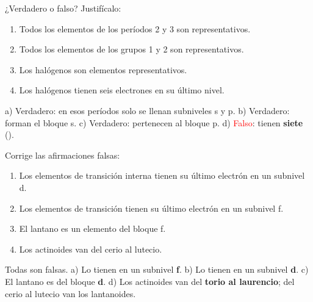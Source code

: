 \begin{exercise}
    ¿Verdadero o falso? Justifícalo:
    \begin{enumerate}[label=\alph*)]
        \item Todos los elementos de los períodos 2 y 3 son representativos.
        \item Todos los elementos de los grupos 1 y 2 son representativos.
        \item Los halógenos son elementos representativos.
        \item Los halógenos tienen seis electrones en su último nivel.
    \end{enumerate}
    \begin{solu}
        a) Verdadero: en esos períodos solo se llenan subniveles s y p. b) Verdadero: forman el bloque s. c) Verdadero: pertenecen al bloque p. d) \textcolor{red}{Falso}: tienen \textbf{siete} ().
    \end{solu}
\end{exercise}

\begin{exercise}
    Corrige las afirmaciones falsas:
    \begin{enumerate}[label=\alph*)]
        \item Los elementos de transición interna tienen su último electrón en un subnivel d.
        \item Los elementos de transición tienen su último electrón en un subnivel f.
        \item El lantano es un elemento del bloque f.
        \item Los actinoides van del cerio al lutecio.
    \end{enumerate}
    \begin{solu}
        Todas son falsas. a) Lo tienen en un subnivel \textbf{f}. b) Lo tienen en un subnivel \textbf{d}. c) El lantano es del bloque \textbf{d}. d) Los actinoides van del \textbf{torio al laurencio}; del cerio al lutecio van los lantanoides.
    \end{solu}
\end{exercise}

